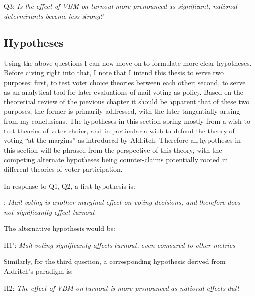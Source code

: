 \documentclass[12pt,twoside]{reedthesis}
\begin{document}
  \begin{center}   
  Q3: \textit{Is  the  effect  of  VBM on turnout more  pronounced as significant, national determinants become less strong?}
  \end{center}
  
  \subsection{Hypotheses}\label{hypotheses-1}
  
  Using the above questions I can now move on to formulate more clear
  hypotheses. Before diving right into that, I note that I intend this
  thesis to serve two purposes: first, to test voter choice theories
  between each other; second, to serve as an analytical tool for later
  evaluations of mail voting as policy. Based on the theoretical review of
  the previous chapter it should be apparent that of these two purposes,
  the former is primarily addressed, with the later tangentially arising
  from my conclusions. The hypotheses in this section spring mostly from a
  wish to test theories of voter choice, and in particular a wish to
  defend the theory of voting ``at the margins'' as introduced by
  Aldritch. Therefore all hypotheses in this section will be phrased from
  the perspective of this theory, with the competing alternate hypotheses
  being counter-claims potentially rooted in different theories of voter
  participation.
  
  In response to Q1, Q2, a first hypothesis is:
  
  \begin{center}  
  : \textit{Mail voting is another marginal effect on voting decisions, and therefore
  does not significantly affect turnout}
  \end{center}
  
  The alternative hypothesis would be:
  
  \begin{center}  
  H1': \textit{Mail  voting  significantly  affects  turnout,  even  compared  to  other  metrics}
  \end{center}
  
  Similarly, for the third question, a corresponding hypothesis derived
  from Aldritch's paradigm is:
  
  \begin{center}  
  H2: \textit{The  effect  of  VBM  on  turnout  is  more  pronounced  as  national  effects  dull}
  \end{center}
  
\end{document}

